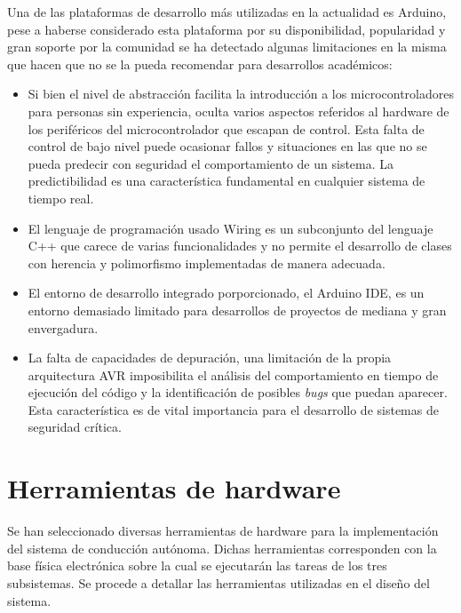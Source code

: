     Una de las plataformas de desarrollo más utilizadas en la actualidad es Arduino, pese a haberse considerado esta plataforma 
    por su disponibilidad, popularidad y gran soporte por la comunidad se ha detectado algunas limitaciones en la misma 
    que hacen que no se la pueda recomendar para desarrollos académicos:

    \begin{itemize}
        \item Si bien el nivel de abstracción facilita la introducción a los microcontroladores para personas 
        sin experiencia, oculta varios aspectos referidos al hardware de los periféricos del microcontrolador que 
        escapan de control. Esta falta de control de bajo nivel puede ocasionar fallos y situaciones en las que no 
        se pueda predecir con seguridad el comportamiento de un sistema. La predictibilidad es una característica 
        fundamental en cualquier sistema de tiempo real.

        \item El lenguaje de programación usado Wiring es un subconjunto del lenguaje C++ que carece de varias 
        funcionalidades y no permite el desarrollo de clases con herencia y polimorfismo implementadas de manera adecuada.

        \item El entorno de desarrollo integrado porporcionado, el Arduino IDE, es un entorno demasiado limitado 
        para desarrollos de proyectos de mediana y gran envergadura.

        \item La falta de capacidades de depuración, una limitación de la propia arquitectura AVR imposibilita el 
        análisis del comportamiento en tiempo de ejecución del código y la identificación de posibles \textit{bugs} 
        que puedan aparecer. Esta característica es de vital importancia para el desarrollo de sistemas de seguridad crítica.

    \end{itemize}


\section{Herramientas de hardware}\label{sec:hardware}
Se han seleccionado diversas herramientas de hardware para la implementación del sistema de conducción autónoma. Dichas herramientas
corresponden con la base física electrónica sobre la cual se ejecutarán las tareas de los tres subsistemas. Se procede a detallar 
las herramientas utilizadas en el diseño del sistema.

